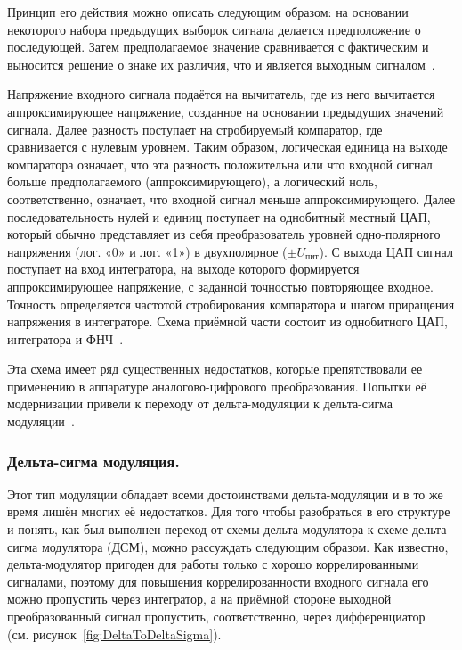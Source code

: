 Принцип его действия можно описать следующим образом: на основании некоторого набора предыдущих выборок сигнала делается предположение о последующей. Затем предполагаемое значение сравнивается с фактическим и выносится решение о знаке их различия, что и является выходным сигналом~\cite{KitE_DeltaSigma}.

Напряжение входного сигнала подаётся на вычитатель, где из него вычитается аппроксимирующее напряжение, созданное на основании предыдущих значений сигнала. Далее разность поступает на стробируемый компаратор, где сравнивается с нулевым уровнем. Таким образом, логическая единица на выходе компаратора означает, что эта разность положительна или что входной сигнал больше предполагаемого (аппроксимирующего), а логический ноль, соответственно, означает, что входной сигнал меньше аппроксимирующего. Далее последовательность нулей и единиц поступает на однобитный местный ЦАП, который обычно представляет из себя преобразователь уровней одно-полярного напряжения (лог. «0» и лог. «1») в двухполярное ($\pm{}U_{\text{пит}}$). С выхода ЦАП сигнал поступает на вход интегратора, на выходе которого формируется аппроксимирующее напряжение, с заданной точностью повторяющее входное. Точность определяется частотой стробирования компаратора и шагом приращения напряжения в интеграторе. Схема приёмной части состоит из однобитного ЦАП, интегратора и ФНЧ~\cite{KitE_DeltaSigma}.

Эта схема имеет ряд существенных недостатков, которые препятствовали ее применению в аппаратуре аналогово-цифрового преобразования. Попытки её модернизации привели к переходу от дельта-модуляции к дельта-сигма модуляции~\cite{KitE_DeltaSigma}.

\subsubsection{Дельта-сигма модуляция. }
Этот тип модуляции обладает всеми достоинствами дельта-модуляции и в то же время лишён многих её недостатков. Для того чтобы разобраться в его структуре и понять, как был выполнен переход от схемы дельта-модулятора к схеме дельта-сигма модулятора (ДСМ), можно рассуждать следующим образом. Как известно, дельта-модулятор пригоден для работы только с хорошо коррелированными сигналами, поэтому для повышения коррелированности входного сигнала его можно пропустить через интегратор, а на приёмной стороне выходной преобразованный сигнал пропустить, соответственно, через дифференциатор~\cite{KitE_DeltaSigma} (см. рисунок~\ref{fig:DeltaToDeltaSigma}).

